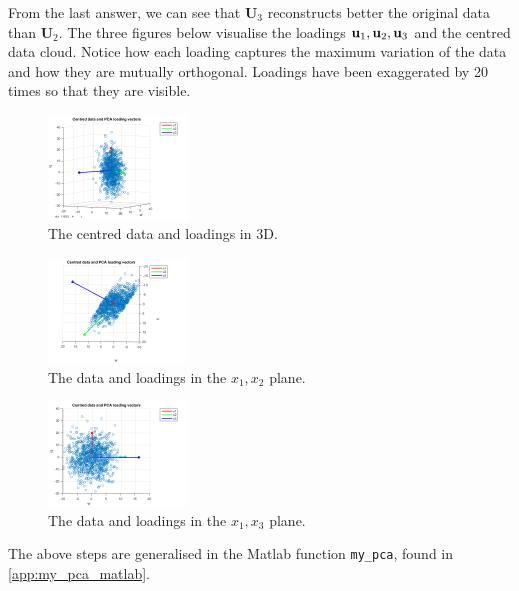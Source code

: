 \documentclass[a4paper]{article}
\begin{document}
From the last answer, we can see that $\textbf{U}_3$ reconstructs better the original data than $\textbf{U}_2$. The three figures below visualise the loadings $\textbf{u}_1,\textbf{u}_2,\textbf{u}_3$ and the centred data cloud. Notice how each loading captures the maximum variation of the data and how they are mutually orthogonal. Loadings have been exaggerated by 20 times so that they are visible.
\begin{multicols}{3}
  \begin{figure}[H]
      \centering
      \includegraphics[width=0.33\textwidth]{img/whiq_xyz.png}
      \caption{The centred data and loadings in 3D.}
  \end{figure}
  
 \columnbreak
   \begin{figure}[H]
      \centering
      \includegraphics[width=0.33\textwidth]{img/whiq_xy.png}
      \caption{The data and loadings in the $x_1,x_2$ plane.}
  \end{figure}
 
 \columnbreak
   
 \columnbreak
   \begin{figure}[H]
      \centering
      \includegraphics[width=0.33\textwidth]{img/whiq_xz.png}
      \caption{The data and loadings in the $x_1,x_3$ plane.}
  \end{figure}
\end{multicols}
The above steps are generalised in the Matlab function \texttt{my\_pca}, found in \ref{app:my_pca_matlab}. 
  
\end{document}
